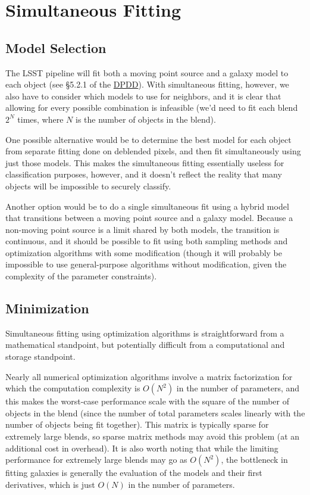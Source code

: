 \documentclass[10pt]{article}
\newcommand{\ds}[2]{{\color{blue} \href{https://docushare.lsstcorp.org/docushare/dsweb/Get/#1}{#2}}\xspace}
\newcommand{\DPDD}{\ds{LSE-163}{DPDD}}
\begin{document}
\section{Simultaneous Fitting}

\subsection{Model Selection}

\label{sec:model-selection}

The LSST pipeline will fit both a moving point source and a galaxy model to
each object (see \S 5.2.1 of the \DPDD).  With simultaneous fitting, however,
we also have to consider which models to use for neighbors, and it is clear
that allowing for every possible combination is infeasible (we'd need to fit
each blend $2^N$ times, where $N$ is the number of objects in the blend).

One possible alternative would be to determine the best model for each
object from separate fitting done on deblended pixels, and then fit
simultaneously using just those models.  This makes the simultaneous fitting
essentially useless for classification purposes, however, and it doesn't
reflect the reality that many objects will be impossible to securely classify.

Another option would be to do a single simultaneous fit using a hybrid model
that transitions between a moving point source and a galaxy model.  Because
a non-moving point source is a limit shared by both models, the transition is
continuous, and it should be possible to fit using both sampling methods and
optimization algorithms with some modification (though it will probably be
impossible to use general-purpose algorithms without modification, given the
complexity of the parameter constraints).

\subsection{Minimization}

Simultaneous fitting using optimization algorithms is straightforward from a
mathematical standpoint, but potentially difficult from a computational and
storage standpoint.

Nearly all numerical optimization algorithms involve a matrix factorization
for which the computation complexity is $O(N^2)$ in the number of parameters,
and this makes the worst-case performance scale with the square of the number
of objects in the blend (since the number of total parameters scales linearly
with the number of objects being fit together).  This matrix is typically
sparse for extremely large blends, so sparse matrix methods may avoid this
problem (at an additional cost in overhead).  It is also worth noting that
while the limiting performance for extremely large blends may go as $O(N^2)$,
the bottleneck in fitting galaxies is generally the evaluation of the
models and their first derivatives, which is just $O(N)$ in the number of
parameters.
\end{document}
